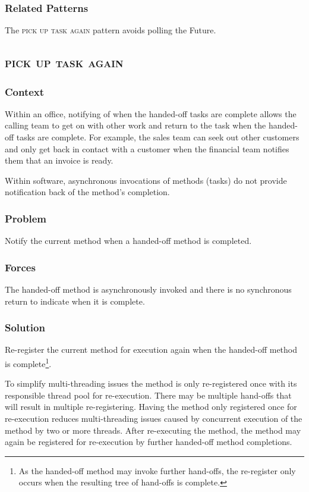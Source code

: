 \documentclass[prodmode]{style/acmlarge}
\begin{document}
\subsubsection*{Related Patterns} The \textsc{pick up task again} pattern avoids
polling the Future.



\subsection{\textsc{\textbf{pick up task again}}}

\subsubsection*{Context} Within an office, notifying of when the handed-off tasks
are complete allows the calling team to get on with other work and return to the
task when the handed-off tasks are complete.  For example, the sales team can
seek out other customers and only get back in contact with a customer when the
financial team notifies them that an invoice is ready.

Within software, asynchronous invocations of methods (tasks) do not provide
notification back of the method's completion.

\subsubsection*{\textbf{Problem}} Notify the current method when a handed-off method is
completed.

\subsubsection*{Forces} The handed-off method is asynchronously invoked and there is
no synchronous return to indicate when it is complete.

\subsubsection*{\textbf{Solution}} Re-register the current method for execution again
when the handed-off method is complete\footnote{As the handed-off method may
invoke further hand-offs, the re-register only occurs when the resulting tree of
hand-offs is complete.}.

To simplify multi-threading issues the method is only re-registered once with
its responsible thread pool for re-execution.  There may be multiple hand-offs
that will result in multiple re-registering.  Having the method only registered
once for re-execution reduces multi-threading issues caused by concurrent
execution of the method by two or more threads.  After re-executing the method,
the method may again be registered for re-execution by further handed-off method
completions.
\end{document}
